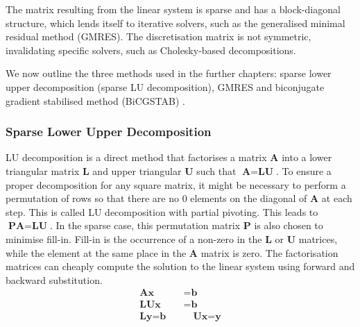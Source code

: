 The matrix resulting from the linear system is sparse and has a block-diagonal structure, which lends itself to iterative solvers, such as the generalised minimal residual method (GMRES). The discretisation matrix is not symmetric, invalidating specific solvers, such as Cholesky-based decompositions. 

We now outline the three methods used in the further chapters: sparse lower upper decomposition (sparse LU decomposition), GMRES \cite{youcef_saad_martin_h_schultz_gmres_1986} and biconjugate gradient stabilised method (BiCGSTAB) \cite{van_der_vorst_bi-cgstab_1992}.

\subsubsection{Sparse Lower Upper Decomposition}
LU decomposition is a direct method that factorises a matrix $\textbf{A}$ into a lower triangular matrix $\textbf{L}$ and upper triangular $\textbf{U}$ such that $\textbf{A} = \textbf{LU}$. To ensure a proper decomposition for any square matrix, it might be necessary to perform a permutation of rows so that there are no 0 elements on the diagonal of $\textbf{A}$ at each step. This is called LU decomposition with partial pivoting. This leads to $\textbf{PA} = \textbf{LU}$. In the sparse case, this permutation matrix $\textbf{P}$ is also chosen to minimise fill-in. Fill-in is the occurrence of a non-zero in the $\textbf{L}$ or $\textbf{U}$ matrices, while the element at the same place in the $\textbf{A}$ matrix is zero. The factorisation matrices can cheaply compute the solution to the linear system using forward and backward substitution.
\begin{align}
    \textbf{Ax} &= \textbf{b}\\
    \textbf{LUx}&= \textbf{b}\\
    \textbf{Ly} = \textbf{b} \quad &\quad \textbf{Ux} = \textbf{y}
\end{align}

